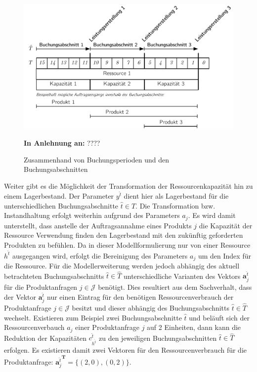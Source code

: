 \begin{figure}[h!]
  \begin{center}
    \includegraphics[width=130mm]{Bilder/Leistungsperioden.pdf}
    \caption{Zusammenhand von Buchungsperioden und den Buchungsabschnitten}  \label{IH}
    {\footnotesize \textbf{In Anlehnung an:} ????} 
  \end{center}
\end{figure}

Weiter gibt es die Möglichkeit der Transformation der Ressourcenkapazität hin zu einem Lagerbestand. Der Parameter $y^{\hat{t}}$ dient hier als Lagerbestand für die unterschiedlichen Buchungsabschnitte $\hat{t}\in\hat{T}$. Die Transformation bzw. Instandhaltung erfolgt weiterhin aufgrund des Parameters $a_j$. Es wird damit unterstellt, dass anstelle der Auftragsannahme eines Produkts $j$ die Kapazität der Ressource Verwendung finden den Lagerbestand mit den zukünftig geforderten Produkten zu befühlen. Da in dieser Modellformulierung nur von einer Ressource $h^{\hat{t}}$ ausgegangen wird, erfolgt die Bereinigung des Parameters $a_{j}$ um den Index für die Ressource. Für die Modellerweiterung werden jedoch abhängig des aktuell betrachteten Buchungsabschnitts $\hat{t}\in\hat{T}$ unterschiedliche Varianten des Vektors $\textbf{a}_{j}^{\hat{t}}$ für die Produktanfragen $j\in\mathcal{J}$ benötigt. Dies resultiert aus dem Sachverhalt, dass der Vektor $\textbf{a}_{j}^{\hat{t}}$ nur einen Eintrag für den benötigen Ressourcenverbrauch der Produktanfrage $j\in\mathcal{J}$ besitzt und dieser abhängig des Buchungsabschnitts $\hat{t}\in\hat{T}$ wechselt. Existieren zum Beispiel zwei Buchungsabschnitte $\hat{t}$ und beläuft sich der Ressourcenverbauch $a_j$ einer Produktanfrage $j$ auf 2 Einheiten, dann kann die Reduktion der Kapazitäten $c^{\hat{t}}_{h^{\hat{t}}}$ zu den jeweiligen Buchungsabschnitten $\hat{t}\in\hat{T}$ erfolgen. Es existieren damit zwei Vektoren für den Ressourcenverbrauch für die Produktanfrage: ${\textbf{a}_{j}^{\hat{t}}}^{\textbf{T}}=\{ (2,0), (0,2)\}$.


